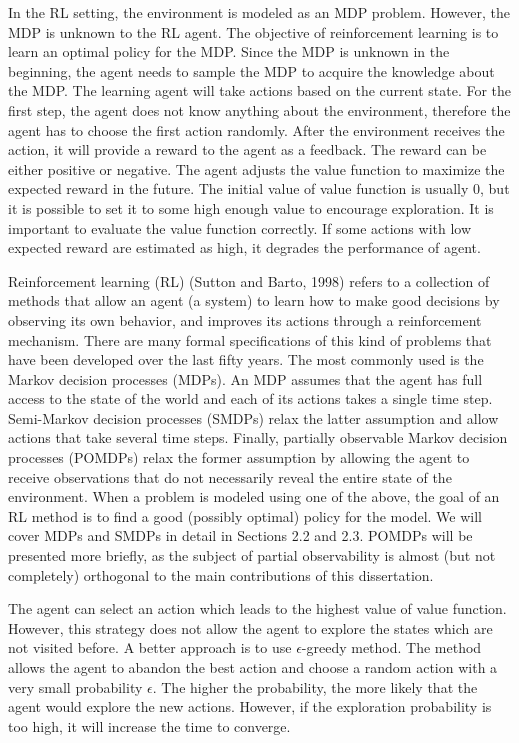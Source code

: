 In the RL setting, the environment is modeled as an MDP problem.
However, the MDP is unknown to the RL agent. The objective of reinforcement learning is to 
learn an optimal policy for the MDP. Since the MDP is unknown in the beginning, 
the agent needs to sample the MDP to acquire the knowledge about the MDP.
The learning agent will take actions based on the current state. For the first step, the agent does not know anything about 
the environment, therefore the agent has to choose the first action randomly. After the environment
receives the action, it will provide a reward to the agent as a feedback. The reward can be either
positive or negative. The agent adjusts the value function to maximize the expected reward in the future.
The initial value of value function is 
usually 0, but it is possible to set it to some high enough value to encourage exploration.
It is important to evaluate the value function 
correctly. If some actions with low expected reward are estimated as high, it degrades the
performance of agent.

Reinforcement learning (RL) (Sutton and Barto, 1998) refers to a collection of methods
that allow an agent (a system) to learn how to make good decisions by observing its
own behavior, and improves its actions through a reinforcement mechanism. There are
many formal specifications of this kind of problems that have been developed over the last
fifty years. The most commonly used is the Markov decision processes (MDPs). An
MDP assumes that the agent has full access to the state of the world and each of its actions
takes a single time step. Semi-Markov decision processes (SMDPs) relax the latter
assumption and allow actions that take several time steps. Finally, partially observable
Markov decision processes (POMDPs) relax the former assumption by allowing the agent
to receive observations that do not necessarily reveal the entire state of the environment.
When a problem is modeled using one of the above, the goal of an RL method is to find a
good (possibly optimal) policy for the model. We will cover MDPs and SMDPs in detail
in Sections 2.2 and 2.3. POMDPs will be presented more briefly, as the subject of partial
observability is almost (but not completely) orthogonal to the main contributions of this
dissertation.


The agent can select an action which leads to the highest value of value function. However, 
this strategy does not allow the agent to explore the states which are not visited before.
A better approach is to use $\epsilon$-greedy method. The method allows the agent to abandon the
best action and choose
a random action with a very small probability $\epsilon$. The higher the probability, the more
likely that the agent would explore the new actions. However, if the exploration probability 
is too high, it will increase the time to converge.

